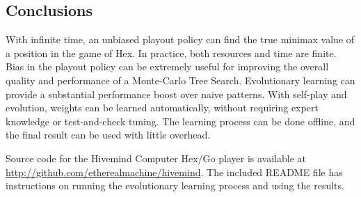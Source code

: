\documentclass[11pt]{report}
\begin{document}
\subsection{Conclusions}
With infinite time, an unbiased playout policy can find the true minimax value of a position in the game of Hex. In practice, both resources and time are finite. Bias in the playout policy can be extremely useful for improving the overall quality and performance of a Monte-Carlo Tree Search. Evolutionary learning can provide a substantial performance boost over naive patterns. With self-play and evolution, weights can be learned automatically, without requiring expert knowledge or test-and-check tuning. The learning process can be done offline, and the final result can be used with little overhead.

Source code for the Hivemind Computer Hex/Go player is available at \url{http://github.com/etherealmachine/hivemind}. The included README file has instructions on running the evolutionary learning process and using the results.



\end{document}
